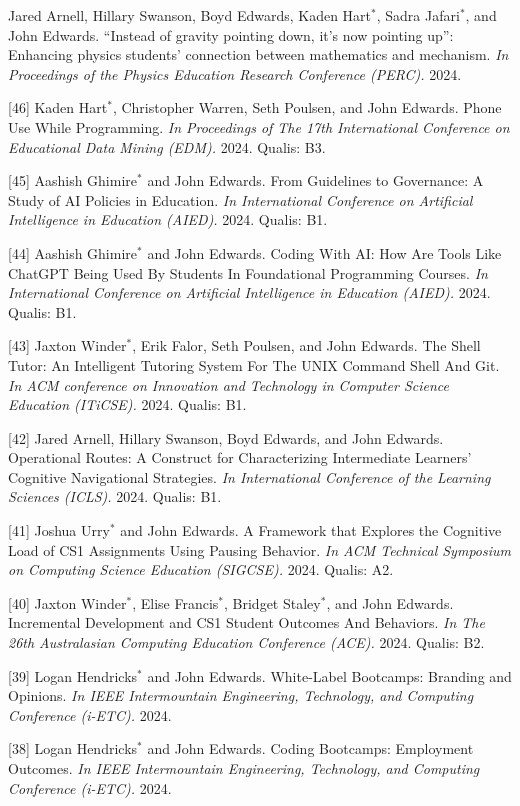 \documentclass[margin,line]{res}
\newcommand{\cnum}[1]{[#1]}
\begin{document}
\begin{resume}
\cnum{47} Jared Arnell, Hillary Swanson, Boyd Edwards, Kaden Hart$^*$, Sadra Jafari$^*$, and John Edwards. ``Instead of gravity pointing down, it’s now pointing up'': Enhancing physics students' connection between mathematics and mechanism. \textit{In Proceedings of the Physics Education Research Conference (PERC).} 2024.

\cnum{46} Kaden Hart$^*$, Christopher Warren, Seth Poulsen, and John Edwards. Phone Use While Programming. \textit{In Proceedings of The 17th International Conference on Educational Data Mining (EDM).} 2024. Qualis: B3.

\cnum{45} Aashish Ghimire$^*$ and John Edwards. From Guidelines to Governance: A Study of AI Policies in Education. \textit{In International Conference on Artificial Intelligence in Education (AIED).} 2024. Qualis: B1.

\cnum{44} Aashish Ghimire$^*$ and John Edwards. Coding With AI: How Are Tools Like ChatGPT Being Used By Students In Foundational Programming Courses. \textit{In International Conference on Artificial Intelligence in Education (AIED).} 2024. Qualis: B1.

\cnum{43} Jaxton Winder$^*$, Erik Falor, Seth Poulsen, and John Edwards. The Shell Tutor: An Intelligent Tutoring System For The UNIX Command Shell And Git. \textit{In ACM conference on Innovation and Technology in Computer Science Education (ITiCSE).} 2024. Qualis: B1.

\cnum{42} Jared Arnell, Hillary Swanson, Boyd Edwards, and John Edwards. Operational Routes: A Construct for Characterizing Intermediate Learners’ Cognitive Navigational Strategies. \textit{In International Conference of the Learning Sciences (ICLS).} 2024. Qualis: B1.

\cnum{41} Joshua Urry$^*$ and John Edwards. A Framework that Explores the Cognitive Load of CS1 Assignments Using Pausing Behavior. \textit{In ACM Technical Symposium on Computing Science Education (SIGCSE).} 2024. Qualis: A2.

\cnum{40} Jaxton Winder$^*$, Elise Francis$^*$, Bridget Staley$^*$, and John Edwards. Incremental Development and CS1 Student Outcomes And Behaviors. \textit{In The 26th Australasian Computing Education Conference (ACE).} 2024. Qualis: B2.

\cnum{39} Logan Hendricks$^*$ and John Edwards. White-Label Bootcamps: Branding and Opinions. \textit{In IEEE Intermountain Engineering, Technology, and Computing Conference (i-ETC).} 2024.

\cnum{38} Logan Hendricks$^*$ and John Edwards. Coding Bootcamps: Employment Outcomes. \textit{In IEEE Intermountain Engineering, Technology, and Computing Conference (i-ETC).} 2024.


\end{resume}
\end{document}
